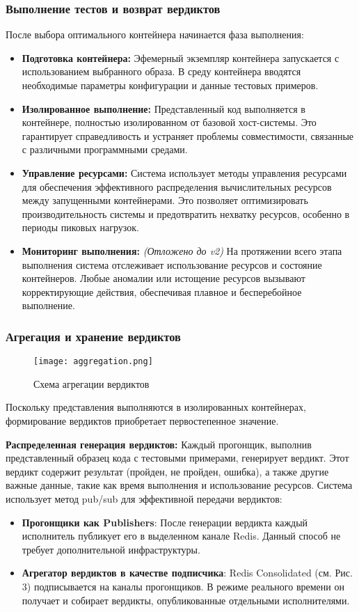 \subsubsection{Выполнение тестов и возврат вердиктов}
После выбора оптимального контейнера начинается фаза выполнения:
\begin{itemize}
    \itemsep 0em
    \item \textbf{Подготовка контейнера:} Эфемерный экземпляр контейнера запускается с использованием выбранного образа. В среду контейнера вводятся необходимые параметры конфигурации и данные тестовых примеров.
    \item \textbf{Изолированное выполнение:} Представленный код выполняется в контейнере, полностью изолированном от базовой хост-системы. Это гарантирует справедливость и устраняет проблемы совместимости, связанные с различными программными средами.
    \item \textbf{Управление ресурсами:} Система использует методы управления ресурсами для обеспечения эффективного распределения вычислительных ресурсов между запущенными контейнерами. Это позволяет оптимизировать производительность системы и предотвратить нехватку ресурсов, особенно в периоды пиковых нагрузок.
    \item \textbf{Мониторинг выполнения:} \textit{(Отложено до v2)} На протяжении всего этапа выполнения система отслеживает использование ресурсов и состояние контейнеров. Любые аномалии или истощение ресурсов вызывают корректирующие действия, обеспечивая плавное и бесперебойное выполнение.
\end{itemize}


\subsubsection{Агрегация и хранение вердиктов}
\begin{figure}[h]
    \centering
    \texttt{[image: aggregation.png]}
    \caption{Схема агрегации вердиктов}
    \noindent
\end{figure}
Поскольку представления выполняются в изолированных контейнерах, формирование вердиктов приобретает первостепенное значение.

\textbf{Распределенная генерация вердиктов:}
\noindent
Каждый прогонщик, выполнив представленный образец кода с тестовыми примерами, генерирует вердикт. Этот вердикт содержит результат (пройден, не пройден, ошибка), а также другие важные данные, такие как время выполнения и использование ресурсов.
Система использует метод pub/sub для эффективной передачи вердиктов:
\begin{itemize}
    \itemsep 0em
    \item \textbf{Прогонщики как Publishers}: После генерации вердикта каждый исполнитель публикует его в выделенном канале Redis. Данный способ не требует дополнительной инфраструктуры.
    \item \textbf{Агрегатор вердиктов в качестве подписчика}: Redis Consolidated (см. Рис. 3) подписывается на каналы прогонщиков. В режиме реального времени он получает и собирает вердикты, опубликованные отдельными исполнителями.
\end{itemize}

